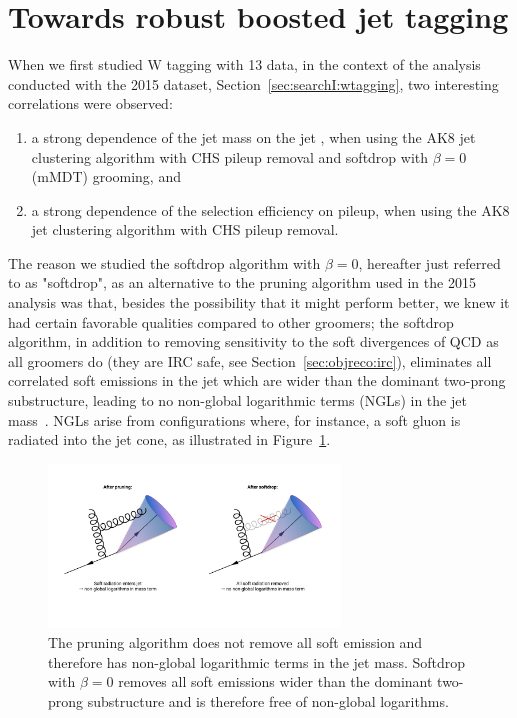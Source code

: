 \section{Towards robust boosted jet tagging}
\label{sec:searchII:intro}
When we first studied W tagging with 13 \TeV data, in the context of the analysis conducted with the 2015 dataset, Section~\ref{sec:searchI:wtagging}, two interesting correlations were observed:
\bigskip
\begin{enumerate}[1)]
\item a strong dependence of the jet mass on the jet \PT, when using the AK8 jet clustering algorithm with CHS pileup removal and softdrop with $\beta = 0$ (mMDT) grooming, and
\item a strong dependence of the \nsubj selection efficiency on pileup, when using the AK8 jet clustering algorithm with CHS pileup removal.
\end{enumerate}
\bigskip
\noindent The reason we studied the softdrop algorithm with $\beta = 0$, hereafter just referred to as "softdrop", as an alternative to the pruning algorithm used in the 2015 analysis was that, besides the possibility that it might perform better, we knew it had certain favorable qualities compared to other groomers; the softdrop algorithm, in addition to removing sensitivity to the soft divergences of QCD as all groomers do (they are IRC safe, see Section~\ref{sec:objreco:irc}), eliminates all correlated soft emissions in the jet which are wider than the dominant two-prong substructure, leading to no non-global logarithmic terms (NGLs) in the jet mass~\cite{Dasgupta:2013ihk}. NGLs arise from configurations where, for instance, a soft gluon is radiated into the jet cone, as illustrated in Figure~\ref{fig:searchII:ngls}. 
\begin{figure}[h!]
\centering
\includegraphics[width=0.69\textwidth]{figures/analysis/search2/misc/ngls.pdf}
\caption{The pruning algorithm does not remove all soft emission and therefore has non-global logarithmic terms in the jet mass. Softdrop with $\beta = 0$ removes all soft emissions wider than the dominant two-prong substructure and is therefore free of non-global logarithms.}
\label{fig:searchII:ngls}
\end{figure}
